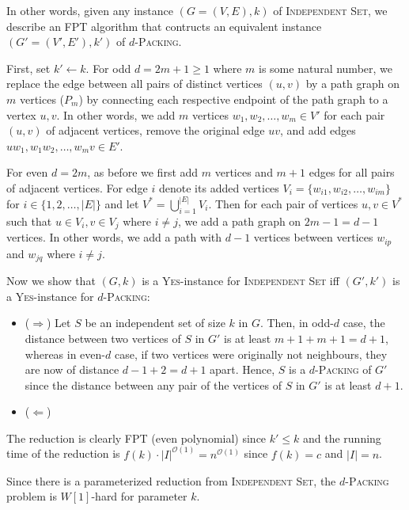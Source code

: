 \documentclass[10pt, a4paper]{article}
\theoremstyle{definition}
\newcommand{\mcO}{\mathcal{O}}
\begin{document}
In other words, given any instance $(G=(V,E), k)$ of \textsc{Independent Set}, we describe an FPT algorithm that contructs an equivalent instance $(G'=(V',E'), k')$ of $d$-\textsc{Packing}.

First, set $k' \leftarrow k$. For odd $d=2m+1 \ge 1$ where $m$ is some natural number, we replace the edge between all pairs of distinct vertices $(u, v)$ by a path graph on $m$ vertices ($P_m$) by connecting each respective endpoint of the path graph to a vertex $u, v$. In other words, we add $m$ vertices $w_1, w_2, \dotsc, w_m \in V'$ for each pair $(u, v)$ of adjacent vertices, remove the original edge $uv$, and add edges $uw_1, w_1w_2, \dotsc, w_mv \in E'$.

For even $d=2m$, as before we first add $m$ vertices and $m+1$ edges for all pairs of adjacent vertices. For edge $i$ denote its added vertices $V_{i} = \{w_{i1}, w_{i2}, \dotsc, w_{im}\}$ for $i \in \{1, 2, \dotsc, |E|\}$ and let $V^{*} = \bigcup_{i=1}^{|E|} V_i$. Then for each pair of vertices $u, v \in V^{*}$ such that $u \in V_i, v \in V_j$ where $i \ne j$, we add a path graph on $2m-1 = d-1$ vertices. In other words, we add a path with $d-1$ vertices between vertices $w_{ip}$ and $w_{jq}$ where $i\ne j$.

Now we show that $(G, k)$ is a \textsc{Yes}-instance for \textsc{Independent Set} iff $(G', k')$ is a \textsc{Yes}-instance for $d$-\textsc{Packing}:

\begin{itemize}
	\item ($\Rightarrow$) Let $S$ be an independent set of size $k$ in $G$. Then, in odd-$d$ case, the distance between two vertices of $S$ in $G'$ is at least $m+1+m+1=d+1$, whereas in even-$d$ case, if two vertices were originally not neighbours, they are now of distance $d-1 + 2 = d+1$ apart. Hence, $S$ is a $d$-\textsc{Packing} of $G'$ since the distance between any pair of the vertices of $S$ in $G'$ is at least $d+1$.
	\item ($\Leftarrow$) 
\end{itemize}

The reduction is clearly FPT (even polynomial) since $k' \leq k$ and the running time of the reduction is $f(k) \cdot |I|^{\mcO(1)} = n^{\mcO(1)}$ since $f(k)=c$ and $|I| = n$.

Since there is a parameterized reduction from \textsc{Independent Set}, the $d$-\textsc{Packing} problem is $W[1]$-hard for parameter $k$. 

\end{document}
